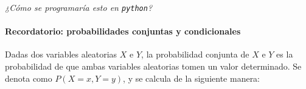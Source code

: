 \emph{¿Cómo se programaría esto en \texttt{python}?}

\begin{Shaded}
\begin{Highlighting}[]


\OperatorTok{=}\OperatorTok{{-}} \NormalTok{)}\OperatorTok{*} \OperatorTok{{-}}\OperatorTok{{-}}\OperatorTok{*}
    
\OperatorTok{=} 


\OperatorTok{=}\NormalTok{(}\NormalTok{, }\NormalTok{))}

\OperatorTok{=}\NormalTok{, }\NormalTok{, }\NormalTok{)}
\OperatorTok{=}\NormalTok{)}

\NormalTok{, }\NormalTok{)}
\NormalTok{, }\NormalTok{)}
\OperatorTok{=}\NormalTok{)}
\OperatorTok{=}\NormalTok{)}
\OperatorTok{=}\OperatorTok{=}\OperatorTok{=}\NormalTok{)}
\end{Highlighting}
\end{Shaded}

\paragraph{Recordatorio: probabilidades conjuntas y
condicionales}\label{recordatorio-probabilidades-conjuntas-y-condicionales}

Dadas dos variables aleatorias \(X\) e \(Y\), la probabilidad conjunta
de \(X\) e \(Y\) es la probabilidad de que ambas variables aleatorias
tomen un valor determinado. Se denota como \(P(X=x,Y=y)\), y se calcula
de la siguiente manera:

